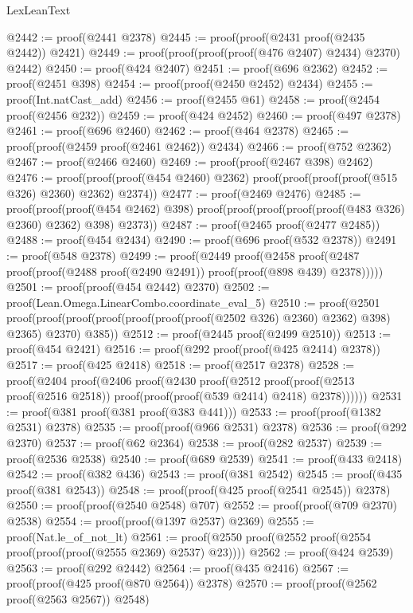 \begin{lexlean}{LexLeanText}
\begin{coremodule}
@2442 := proof(@2441 @2378)
@2445 := proof(proof(@2431 proof(@2435 @2442)) @2421)
@2449 := proof(proof(proof(proof(@476 @2407) @2434) @2370) @2442)
@2450 := proof(@424 @2407)
@2451 := proof(@696 @2362)
@2452 := proof(@2451 @398)
@2454 := proof(proof(@2450 @2452) @2434)
@2455 := proof(Int.natCast_add)
@2456 := proof(@2455 @61)
@2458 := proof(@2454 proof(@2456 @232))
@2459 := proof(@424 @2452)
@2460 := proof(@497 @2378)
@2461 := proof(@696 @2460)
@2462 := proof(@464 @2378)
@2465 := proof(proof(@2459 proof(@2461 @2462)) @2434)
@2466 := proof(@752 @2362)
@2467 := proof(@2466 @2460)
@2469 := proof(proof(@2467 @398) @2462)
@2476 := proof(proof(proof(@454 @2460) @2362)
      proof(proof(proof(proof(@515 @326) @2360) @2362) @2374))
@2477 := proof(@2469 @2476)
@2485 := proof(proof(proof(@454 @2462) @398)
      proof(proof(proof(proof(proof(@483 @326) @2360) @2362) @398) @2373))
@2487 := proof(@2465 proof(@2477 @2485))
@2488 := proof(@454 @2434)
@2490 := proof(@696 proof(@532 @2378))
@2491 := proof(@548 @2378)
@2499 := proof(@2449
      proof(@2458
          proof(@2487 proof(proof(@2488 proof(@2490 @2491)) proof(proof(@898 @439) @2378)))))
@2501 := proof(proof(@454 @2442) @2370)
@2502 := proof(Lean.Omega.LinearCombo.coordinate_eval_5)
@2510 := proof(@2501
      proof(proof(proof(proof(proof(proof(proof(@2502 @326) @2360) @2362) @398) @2365) @2370) @385))
@2512 := proof(@2445 proof(@2499 @2510))
@2513 := proof(@454 @2421)
@2516 := proof(@292 proof(proof(@425 @2414) @2378))
@2517 := proof(@425 @2418)
@2518 := proof(@2517 @2378)
@2528 := proof(@2404
      proof(@2406
          proof(@2430
              proof(@2512
                  proof(proof(@2513 proof(@2516 @2518))
                      proof(proof(proof(@539 @2414) @2418) @2378))))))
@2531 := proof(@381 proof(@381 proof(@383 @441)))
@2533 := proof(proof(@1382 @2531) @2378)
@2535 := proof(proof(@966 @2531) @2378)
@2536 := proof(@292 @2370)
@2537 := proof(@62 @2364)
@2538 := proof(@282 @2537)
@2539 := proof(@2536 @2538)
@2540 := proof(@689 @2539)
@2541 := proof(@433 @2418)
@2542 := proof(@382 @436)
@2543 := proof(@381 @2542)
@2545 := proof(@435 proof(@381 @2543))
@2548 := proof(proof(@425 proof(@2541 @2545)) @2378)
@2550 := proof(proof(@2540 @2548) @707)
@2552 := proof(proof(@709 @2370) @2538)
@2554 := proof(proof(@1397 @2537) @2369)
@2555 := proof(Nat.le_of_not_lt)
@2561 := proof(@2550 proof(@2552 proof(@2554 proof(proof(proof(@2555 @2369) @2537) @23))))
@2562 := proof(@424 @2539)
@2563 := proof(@292 @2442)
@2564 := proof(@435 @2416)
@2567 := proof(proof(@425 proof(@870 @2564)) @2378)
@2570 := proof(proof(@2562 proof(@2563 @2567)) @2548)

\end{coremodule}
\end{lexlean}
